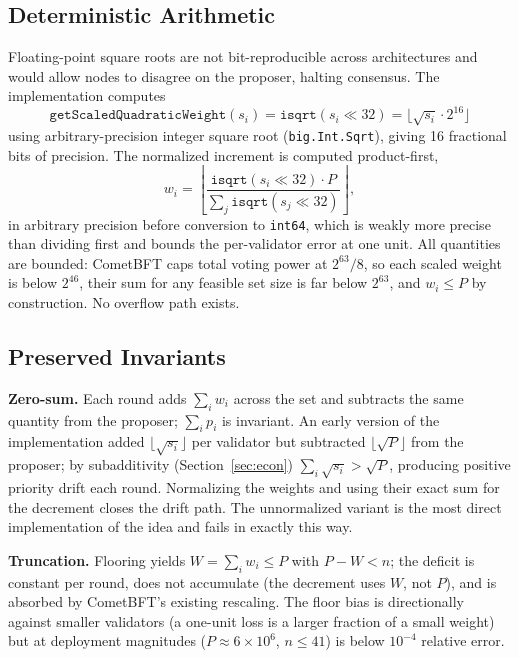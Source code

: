 \documentclass[11pt,a4paper]{article}
\begin{document}
\subsection{Deterministic Arithmetic}

Floating-point square roots are not bit-reproducible across architectures and would allow nodes to disagree on the proposer, halting consensus. The implementation computes
\begin{equation}
\texttt{getScaledQuadraticWeight}(s_i) = \texttt{isqrt}(s_i \ll 32) = \lfloor \sqrt{s_i} \cdot 2^{16} \rfloor
\end{equation}
using arbitrary-precision integer square root (\texttt{big.Int.Sqrt}), giving 16 fractional bits of precision. The normalized increment is computed product-first,
\begin{equation}
w_i = \left\lfloor \frac{\texttt{isqrt}(s_i \ll 32) \cdot P}{\sum_j \texttt{isqrt}(s_j \ll 32)} \right\rfloor,
\end{equation}
in arbitrary precision before conversion to \texttt{int64}, which is weakly more precise than dividing first and bounds the per-validator error at one unit. All quantities are bounded: CometBFT caps total voting power at $2^{63}/8$, so each scaled weight is below $2^{46}$, their sum for any feasible set size is far below $2^{63}$, and $w_i \le P$ by construction. No overflow path exists.

\subsection{Preserved Invariants}

\textbf{Zero-sum.} Each round adds $\sum_i w_i$ across the set and subtracts the same quantity from the proposer; $\sum_i p_i$ is invariant. An early version of the implementation added $\lfloor\sqrt{s_i}\rfloor$ per validator but subtracted $\lfloor\sqrt{P}\rfloor$ from the proposer; by subadditivity (Section~\ref{sec:econ}) $\sum_i \sqrt{s_i} > \sqrt{P}$, producing positive priority drift each round. Normalizing the weights and using their exact sum for the decrement closes the drift path. The unnormalized variant is the most direct implementation of the idea and fails in exactly this way.

\textbf{Truncation.} Flooring yields $W = \sum_i w_i \le P$ with $P - W < n$; the deficit is constant per round, does not accumulate (the decrement uses $W$, not $P$), and is absorbed by CometBFT's existing rescaling. The floor bias is directionally against smaller validators (a one-unit loss is a larger fraction of a small weight) but at deployment magnitudes ($P \approx 6 \times 10^6$, $n \le 41$) is below $10^{-4}$ relative error.
\end{document}
